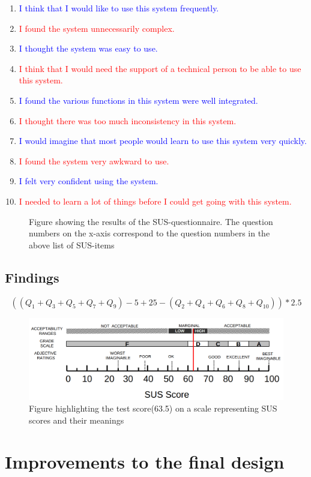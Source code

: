 \begin{enumerate}
	\item  \textcolor{blue}{I think that I would like to use this system frequently.}
	\item  \textcolor{red}{I found the system unnecessarily complex.}
	\item  \textcolor{blue}{I thought the system was easy to use.}
	\item  \textcolor{red}{I think that I would need the support of a technical person to be able to use this system.}
	\item  \textcolor{blue}{I found the various functions in this system were well integrated.}
	\item  \textcolor{red}{I thought there was too much inconsistency in this system.}
	\item  \textcolor{blue}{I would imagine that most people would learn to use this system very quickly.}
	\item  \textcolor{red}{I found the system very awkward to use.}
	\item  \textcolor{blue}{I felt very confident using the system.}
	\item  \textcolor{red}{I needed to learn a lot of things before I could get going with this system.}
\end{enumerate} 

\begin{figure}[H]
	\centering
	
	\caption{Figure showing the results of the SUS-questionnaire. The question numbers on the x-axis correspond to the question numbers in the above list of SUS-items}	
	\label{fig:susResults}
\end{figure}

\subsection{Findings}

$$( (Q_1+Q_3+Q_5+Q_7+Q_9)-5+25-(Q_2+Q_4+Q_6+Q_8+Q_{10}) )*2.5$$

\begin{figure}[H]
	\centering
	\includegraphics[width=1\linewidth]{figure/Design/susScore}
	\caption{Figure highlighting the test score(63.5) on a scale representing SUS scores and their meanings\cite{susScore}}
	\label{fig:susScore}
\end{figure}


\section{Improvements to the final design}
